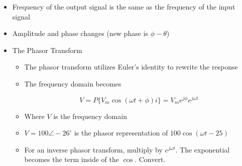 \begin{itemize}
  \item Frequency of the output signal is the same as the frequency of the input signal

  \item Amplitude and phase changes (new phase is $\phi-\theta$)

  \item The Phasor Transform

    \begin{itemize}

      \item The phasor transform utilizes Euler's identity to rewrite the response

      \item The frequency domain becomes

        $$V=P\{V_m\cos(\omega t +\phi)i\}=V_me^{j\phi}e^{j\omega t}$$

      \item Where $V$ is the frequency domain

      \item $V=100\angle-26^{\circ}$ is the phasor representation of $100\cos(\omega t-25)$

      \item For an inverse phasor transform, multiply by $e^{j\omega t}$. The exponential becomes the term inside of the $\cos$. Convert.

    \end{itemize}

\end{itemize}




